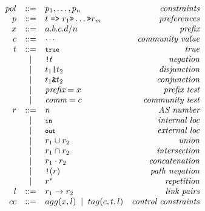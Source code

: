 \begin{figure}
\begin{minipage}[t]{.45\linewidth}
\[\begin{array}{rclr}
     pol     &::=& p_1, \dots, p_n & \textit{constraints} \\
     p       &::=& t \hspace{.3em} \Path \hspace{.3em} r_1 \Prefer \dots \Prefer r_m & \textit{preferences} \\
     x       &::=& a.b.c.d/n & \textit{prefix} \\
     c       &::=& \cdots & \textit{community value} \\
     t       &::=& \True & \textit{true} \\
         &\BNFALT& \NOT t & \textit{negation} \\
         &\BNFALT& t_1 \OR{} t_2 & \textit{disjunction} \\
         &\BNFALT& t_1 \AND{} t_2 & \textit{conjunction} \\
         &\BNFALT& \textit{prefix} = x & \textit{prefix test} \\
         &\BNFALT& \textit{comm} = c & \textit{community test} \\
     r       &::=& n & \textit{AS number} \\
         &\BNFALT& \In & \textit{internal loc} \\
         &\BNFALT& \Out & \textit{external loc} \\
         &\BNFALT& r_1 \cup r_2 & \textit{union} \\
         &\BNFALT& r_1 \cap r_2 & \textit{intersection} \\
         &\BNFALT& r_1 \cdot r_2 & \textit{concatenation} \\
         &\BNFALT& \NOT(r) & \textit{path negation} \\
         &\BNFALT& r^* & \textit{repetition} \\
     l       &::=& r_1 \rightarrow r_2 & \textit{link pairs} \\
     cc     &::=& agg(x, l) \BNFALT tag(c, t, l) & \textit{control constraints} \\
  \end{array} \]


\end{minipage}
\end{figure}
